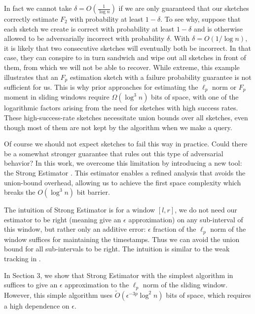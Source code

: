 \documentclass{article}
\newcommand{\est}{\textsf{Strong Estimator }}
\theoremstyle{plain}
\begin{document}
In fact we cannot take $\delta = O(\frac{1}{\log n})$ if we are only guaranteed that our sketches correctly estimate $F_2$ with probability at least $1-\delta$.  To see why, suppose that each sketch we create is correct with probability at least $1-\delta$ and is otherwise allowed to be adversarially incorrect with probability $\delta.$  With $\delta = O(1/\log n),$ it is likely that two consecutive sketches will eventually both be incorrect.  In that case, they can conspire to in turn sandwich and wipe out all sketches in front of them, from which we will not be able to recover.  While extreme, this example illustrates that an $F_p$ estimation sketch with a failure probability guarantee is not sufficient for us.  This is why prior approaches for estimating the  $\ell_p$ norm or $F_p$ moment in sliding windows require $\Omega(\log ^ 3n)$ bits of space, with one of the logarithmic factors arising from the need for sketches with high success rates. These high-success-rate sketches necessitate union bounds over all sketches, even though most of them are not kept by the algorithm when we make a query. 

Of course we should not expect sketches to fail this way in practice.  Could there be a somewhat stronger guarantee that rules out this type of adversarial behavior?  In this work, we overcome this limitation by introducing a new tool: the \est. This estimator enables a refined analysis that avoids the union-bound overhead, allowing us to achieve the first space complexity which breaks the  $O(\log^ 3 n)$ bit barrier. 

The intuition of \est is for a window $[l, r]$, we do not need our estimator to be right (meaning give an $\epsilon$ approximation) on any sub-interval of this window, but rather only an additive error: $\epsilon$ fraction of the $\ell_p$ norm of the window suffices for maintaining the timestamps. Thus we can avoid the union bound for all sub-intervals to be right. The intuition is similar to the weak tracking in \cite{blasiok2017continuous}.

In Section $3$, we show that \est with the simplest algorithm in \cite{2007} suffices to give an $\epsilon$ approximation to the $\ell_p$ norm of the sliding window. However, this simple algorithm uses $\tilde{O}(\epsilon ^ {-3p} \log ^ 2n)$ bits of space, which requires a high dependence on $\epsilon$. 
\end{document}
